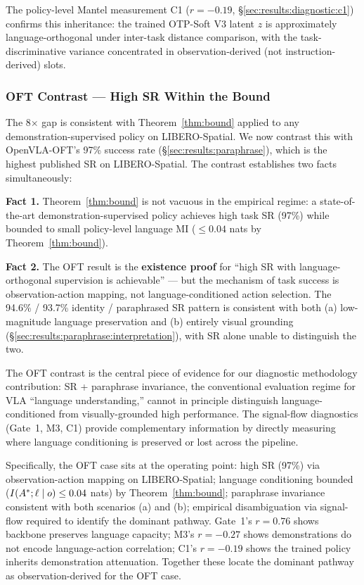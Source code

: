 The policy-level Mantel measurement C1 ($r = -0.19$, \S\ref{sec:results:diagnostic:c1})
confirms this inheritance: the trained OTP-Soft V3 latent $z$ is approximately
language-orthogonal under inter-task distance comparison, with the task-discriminative
variance concentrated in observation-derived (not instruction-derived) slots.

\subsubsection{OFT Contrast --- High SR Within the Bound}
\label{sec:results:oft_contrast:existence_proof}

The 8$\times$ gap is consistent with Theorem~\ref{thm:bound} applied to any
demonstration-supervised policy on LIBERO-Spatial. We now contrast this with
OpenVLA-OFT's 97\% success rate (\S\ref{sec:results:paraphrase}), which is the highest
published SR on LIBERO-Spatial. The contrast establishes two facts simultaneously:

\textbf{Fact 1.} Theorem~\ref{thm:bound} is not vacuous in the empirical regime: a
state-of-the-art demonstration-supervised policy achieves high task SR (97\%) while
bounded to small policy-level language MI ($\le 0.04$ nats by
Theorem~\ref{thm:bound}).

\textbf{Fact 2.} The OFT result is the \textbf{existence proof} for ``high SR with
language-orthogonal supervision is achievable'' --- but the mechanism of task success is
observation-action mapping, not language-conditioned action selection. The 94.6\% /
93.7\% identity / paraphrased SR pattern is consistent with both (a) low-magnitude
language preservation and (b) entirely visual grounding
(\S\ref{sec:results:paraphrase:interpretation}), with SR alone unable to distinguish the
two.

The OFT contrast is the central piece of evidence for our diagnostic methodology
contribution: SR + paraphrase invariance, the conventional evaluation regime for VLA
``language understanding,'' cannot in principle distinguish language-conditioned from
visually-grounded high performance. The signal-flow diagnostics (Gate~1, M3, C1) provide
complementary information by directly measuring where language conditioning is preserved
or lost across the pipeline.

Specifically, the OFT case sits at the operating point: high SR (97\%) via
observation-action mapping on LIBERO-Spatial; language conditioning bounded ($I(A^{*};
\ell \mid o) \le 0.04$ nats) by Theorem~\ref{thm:bound}; paraphrase invariance
consistent with both scenarios (a) and (b); empirical disambiguation via signal-flow
required to identify the dominant pathway. Gate~1's $r = 0.76$ shows backbone preserves
language capacity; M3's $r = -0.27$ shows demonstrations do not encode language-action
correlation; C1's $r = -0.19$ shows the trained policy inherits demonstration
attenuation. Together these locate the dominant pathway as observation-derived for the
OFT case.

